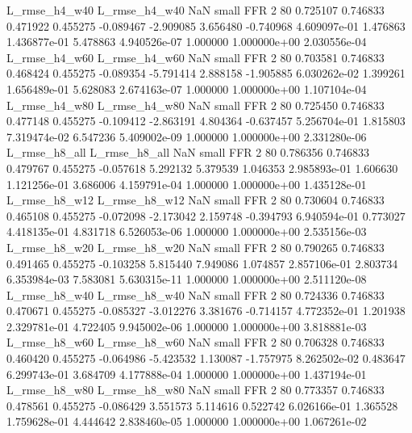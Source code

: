  L_rmse_h4_w40  L_rmse_h4_w40                   NaN      small      FFR                 2 80 0.725107       0.746833 0.471922       0.455275   -0.089467     -2.909085      3.656480    -0.740968   4.609097e-01  1.476863 1.436877e-01     5.478863   4.940526e-07            1.000000    1.000000e+00        2.030556e-04
 L_rmse_h4_w60  L_rmse_h4_w60                   NaN      small      FFR                 2 80 0.703581       0.746833 0.468424       0.455275   -0.089354     -5.791414      2.888158    -1.905885   6.030262e-02  1.399261 1.656489e-01     5.628083   2.674163e-07            1.000000    1.000000e+00        1.107104e-04
 L_rmse_h4_w80  L_rmse_h4_w80                   NaN      small      FFR                 2 80 0.725450       0.746833 0.477148       0.455275   -0.109412     -2.863191      4.804364    -0.637457   5.256704e-01  1.815803 7.319474e-02     6.547236   5.409002e-09            1.000000    1.000000e+00        2.331280e-06
 L_rmse_h8_all  L_rmse_h8_all                   NaN      small      FFR                 2 80 0.786356       0.746833 0.479767       0.455275   -0.057618      5.292132      5.379539     1.046353   2.985893e-01  1.606630 1.121256e-01     3.686006   4.159791e-04            1.000000    1.000000e+00        1.435128e-01
 L_rmse_h8_w12  L_rmse_h8_w12                   NaN      small      FFR                 2 80 0.730604       0.746833 0.465108       0.455275   -0.072098     -2.173042      2.159748    -0.394793   6.940594e-01  0.773027 4.418135e-01     4.831718   6.526053e-06            1.000000    1.000000e+00        2.535156e-03
 L_rmse_h8_w20  L_rmse_h8_w20                   NaN      small      FFR                 2 80 0.790265       0.746833 0.491465       0.455275   -0.103258      5.815440      7.949086     1.074857   2.857106e-01  2.803734 6.353984e-03     7.583081   5.630315e-11            1.000000    1.000000e+00        2.511120e-08
 L_rmse_h8_w40  L_rmse_h8_w40                   NaN      small      FFR                 2 80 0.724336       0.746833 0.470671       0.455275   -0.085327     -3.012276      3.381676    -0.714157   4.772352e-01  1.201938 2.329781e-01     4.722405   9.945002e-06            1.000000    1.000000e+00        3.818881e-03
 L_rmse_h8_w60  L_rmse_h8_w60                   NaN      small      FFR                 2 80 0.706328       0.746833 0.460420       0.455275   -0.064986     -5.423532      1.130087    -1.757975   8.262502e-02  0.483647 6.299743e-01     3.684709   4.177888e-04            1.000000    1.000000e+00        1.437194e-01
 L_rmse_h8_w80  L_rmse_h8_w80                   NaN      small      FFR                 2 80 0.773357       0.746833 0.478561       0.455275   -0.086429      3.551573      5.114616     0.522742   6.026166e-01  1.365528 1.759628e-01     4.444642   2.838460e-05            1.000000    1.000000e+00        1.067261e-02

